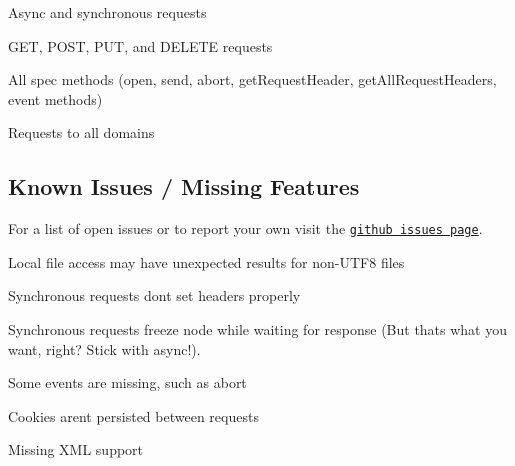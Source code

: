 \begin{DoxyItemize}
\item Async and synchronous requests
\item G\+ET, P\+O\+ST, P\+UT, and D\+E\+L\+E\+TE requests
\item All spec methods (open, send, abort, get\+Request\+Header, get\+All\+Request\+Headers, event methods)
\item Requests to all domains
\end{DoxyItemize}

\subsection*{Known Issues / Missing Features}

For a list of open issues or to report your own visit the \href{https://github.com/driverdan/node-XMLHttpRequest/issues}{\tt github issues page}.


\begin{DoxyItemize}
\item Local file access may have unexpected results for non-\/\+U\+T\+F8 files
\item Synchronous requests don\textquotesingle{}t set headers properly
\item Synchronous requests freeze node while waiting for response (But that\textquotesingle{}s what you want, right? Stick with async!).
\item Some events are missing, such as abort
\item Cookies aren\textquotesingle{}t persisted between requests
\item Missing X\+ML support 
\end{DoxyItemize}